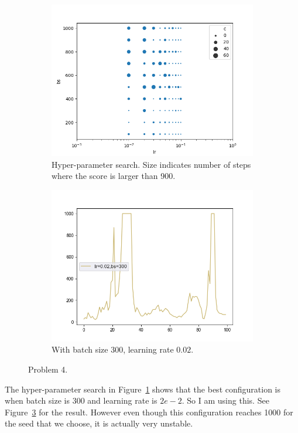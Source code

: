 \begin{figure}[htbp]
    \begin{subfigure}[b]{0.5\linewidth}
        \centering
        \includegraphics[width=1.0\linewidth]{figures/p4-hyper.png}
        \caption{Hyper-parameter search. Size indicates number of steps where the score is larger than 900.}
        \label{fig:p4-hyper}
    \end{subfigure}
    \begin{subfigure}[b]{0.5\linewidth}
        \centering
        \includegraphics[width=1.0\linewidth]{figures/p4-final.png}
        \caption{With batch size 300, learning rate $0.02$.}
        \label{fig:p4-final}
    \end{subfigure}
    \caption{Problem 4.}
\end{figure}
The hyper-parameter search in Figure~\ref{fig:p4-hyper} shows that the best configuration is when batch size is 300 and learning rate is $2e-2$. So I am 
using this. See Figure~\ref{fig:p4-final} for the result. However even though this configuration reaches 1000 for the seed that we choose, it is actually very unstable.
